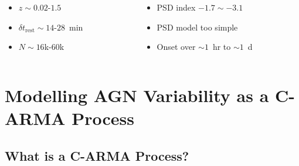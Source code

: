 \documentclass[hyperref={pdfpagelabels=false}]{beamer}
\begin{document}
\begin{frame}
\begin{columns}
\begin{column}{0.35\textwidth}
\begin{figure}
      \end{figure}
    \end{column}
  \end{columns}
  \begin{columns}
    \centering
    \begin{column}{0.35\textwidth}
      \begin{itemize}
        \item {\tiny $z \sim 0.02$-$1.5$}
        \item {\tiny $\delta t_{\mathrm{rest}} \sim 14$-$28$~min}
        \item {\tiny $N \sim 16$k-$60$k}
      \end{itemize}
    \end{column}
    \begin{column}{0.35\textwidth}
      \begin{itemize}
        \item {\tiny PSD index $-1.7 \sim -3.1$}
        \item {\tiny PSD model too simple}
        \item {\tiny Onset over $\sim 1$~hr to $\sim 1$~d}
      \end{itemize}
    \end{column}
  \end{columns}
\end{frame}

\section{Modelling AGN Variability as a C-ARMA Process}

\subsection{What is a C-ARMA Process?}
\end{document}
